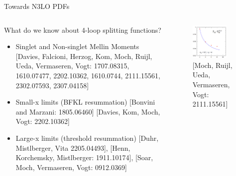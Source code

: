 \documentclass[aspectratio=169, 8pt,t]{beamer}
\begin{document}
\begin{frame}{Towards N3LO PDFs}
\begin{columns}[T]
\begin{column}{0.59\textwidth}
      \vspace*{1em}
      What do we know about 4-loop splitting functions?
      \begin{itemize}
        \item Singlet and Non-singlet Mellin Moments
        {\color{gray}\small [Davies, Falcioni, Herzog, Kom, Moch, Ruijl, Ueda, Vermaseren, Vogt: 1707.08315, 1610.07477, 2202.10362, 1610.0744, 2111.15561, 2302.07593, 2307.04158]}
        \item Small-x limits (BFKL resummation) {\color{gray}\small [Bonvini and Marzani: 1805.06460] [Davies, Kom, Moch, Vogt: 2202.10362]}
        \item Large-x limits (threshold resummation) {\color{gray}\small [Duhr, Mistlberger, Vita 2205.04493], [Henn, Korchemsky, Mistlberger: 1911.10174], [Soar, Moch, Vermaseren, Vogt: 0912.0369]}
      \end{itemize}
    \end{column}
    \begin{column}{0.39\textwidth}
      \begin{figure}
        \includegraphics[width=0.8\textwidth]{figures/splittingmoments.png}
        \caption*{\color{gray}\small[Moch, Ruijl, Ueda, Vermaseren, Vogt: 2111.15561]}
      \end{figure}
    \end{column}
  \end{columns}


\end{frame}
\end{document}
